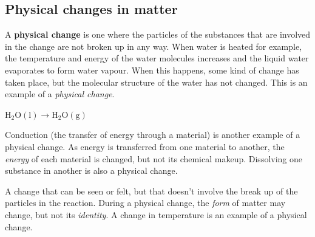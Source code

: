             \subsection{ Physical changes in matter}
            \nopagebreak
      \label{m38709*id62200}A \textbf{physical change} is one where the particles of the substances that are involved in the change are not broken up in any way. When water is heated for example, the temperature and energy of the water molecules increases and the liquid water evaporates to form water vapour. When this happens, some kind of change has taken place, but the molecular structure of the water has not changed. This is an example of a \textsl{physical change}.\par 
      \label{m38709*id62556}$\mathrm{H}{}_{2}\mathrm{O}\left(\mathrm{l}\right)\to \mathrm{H}{}_{2}\mathrm{O}\left(\mathrm{g}\right)$
      \par 
      \label{m38709*id62600}Conduction (the transfer of energy through a material) is another example of a physical change. As energy is transferred from one material to another, the \textsl{energy} of each material is changed, but not its chemical makeup. Dissolving one substance in another is also a physical change.\par 
\label{m38709*fhsst!!!underscore!!!id76}
  { \label{m38709*meaningfhsst!!!underscore!!!id76}
      A change that can be seen or felt, but that doesn't involve the break up of the particles in the reaction. During a physical change, the \textsl{form} of matter may change, but not its \textsl{identity}. A change in temperature is an example of a physical change. 
       } 

